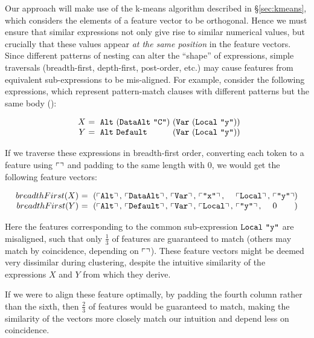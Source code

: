 Our approach will make use of the k-means algorithm described in \S \ref{sec:kmeans}, which considers the elements of a feature vector to be orthogonal. Hence we must ensure that similar expressions not only give rise to similar numerical values, but crucially that these values appear \emph{at the same position} in the feature vectors. Since different patterns of nesting can alter the ``shape'' of expressions, simple traversals (breadth-first, depth-first, post-order, etc.) may cause features from equivalent sub-expressions to be mis-aligned. For example, consider the following expressions, which represent pattern-match clauses with different patterns but the same body ():

\begin{equation*}
  \begin{array}{r@{}l@{}l@{}}
    X\ &=\ \CAlt\ (\CDataAlt\ \id{C})\ & (\vlocal{y}) \\
    Y\ &=\ \CAlt\ \CDefault\           & (\vlocal{y})
  \end{array}
\end{equation*}

If we traverse these expressions in breadth-first order, converting each token to a feature using $\left\ulcorner  \right\urcorner$ and padding to the same length with $0$, we would get the following feature vectors:

\begin{small}
  \begin{equation*}
    \begin{array}{r@{}l@{}l@{}l@{}l@{}l@{}l@{}l}
      breadthFirst(X)\ &=\ (\feature{\CAlt},\ &\feature{\CDataAlt},\ &\feature{\CVar},\ &\feature{\id{x}},\ &\feature{\CLocal},\ &\feature{\id{y}} &) \\
      breadthFirst(Y)\ &=\ (\feature{\CAlt},\ &\feature{\CDefault},\ &\feature{\CVar},\ &\feature{\CLocal},\ &\feature{\id{y}},\ &0 &)
    \end{array}
  \end{equation*}
\end{small}

Here the features corresponding to the common sub-expression $\texttt{Local}\ \texttt{"y"}$ are misaligned, such that only $\frac{1}{3}$ of features are guaranteed to match (others may match by coincidence, depending on $\left\ulcorner  \right\urcorner$). These feature vectors might be deemed very dissimilar during clustering, despite the intuitive similarity of the expressions $X$ and $Y$ from which they derive.

If we were to align these feature optimally, by padding the fourth column rather than the sixth, then $\frac{2}{3}$ of features would be guaranteed to match, making the similarity of the vectors more closely match our intuition and depend less on coincidence.

